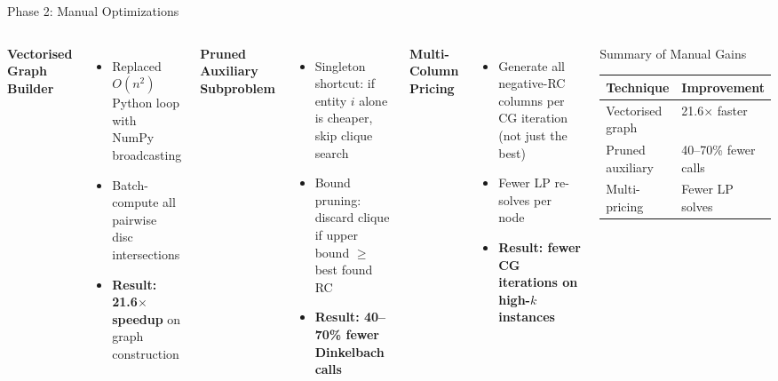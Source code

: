 \documentclass[aspectratio=169,12pt]{beamer}
\begin{document}
\begin{frame}{Phase 2: Manual Optimizations}
  \begin{columns}[T]
      \textbf{Vectorised Graph Builder}
      \begin{itemize}
        \item Replaced $O(n^2)$ Python loop with NumPy broadcasting
        \item Batch-compute all pairwise disc intersections
        \item \textbf{Result: 21.6$\times$ speedup} on graph construction
      \end{itemize}

      \vspace{0.4em}
      \textbf{Pruned Auxiliary Subproblem}
      \begin{itemize}
        \item Singleton shortcut: if entity $i$ alone is cheaper, skip clique search
        \item Bound pruning: discard clique if upper bound $\geq$ best found RC
        \item \textbf{Result: 40--70\% fewer Dinkelbach calls}
      \end{itemize}

      \textbf{Multi-Column Pricing}
      \begin{itemize}
        \item Generate all negative-RC columns per CG iteration (not just the best)
        \item Fewer LP re-solves per node
        \item \textbf{Result: fewer CG iterations on high-$k$ instances}
      \end{itemize}

      \vspace{0.3em}
      \begin{block}{Summary of Manual Gains}
        \begin{tabular}{ll}
          \toprule
          Technique & Improvement \\
          \midrule
          Vectorised graph & 21.6$\times$ faster \\
          Pruned auxiliary & 40--70\% fewer calls \\
          Multi-pricing & Fewer LP solves \\
          \bottomrule
        \end{tabular}
      \end{block}
  \end{columns}
\end{frame}
\end{document}
